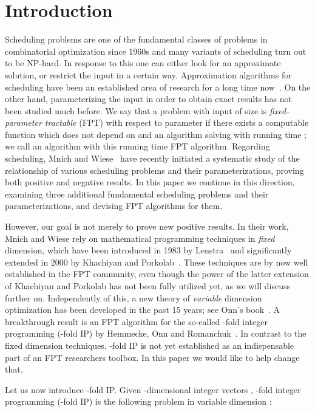 \documentclass{llncs}
\newcommand{\FPT}{{\sf FPT}\xspace}
\newcommand{\NP}{{\sf NP}\xspace}
\begin{document}
\section{Introduction}
Scheduling problems are one of the fundamental classes of problems in combinatorial optimization since 1960s \cite{Allahverdi:15,LawlerLKS:93,Potts:09} and many variants of scheduling turn out to be \NP-hard. In response to this one can either look for an approximate solution, or restrict the input in a certain way. Approximation algorithms for scheduling have been an established area of research for a long time now~\cite{LawlerLKS:93}. On the other hand, parameterizing the input in order to obtain exact results has not been studied much before. We say that a problem  with input of size  is \textit{fixed-parameter tractable} (\FPT) with respect to parameter  if there exists a computable function  which does not depend on  and an algorithm solving  with running time ; we call an algorithm with this running time \FPT algorithm. Regarding scheduling, Mnich and Wiese~\cite{MnichW:14} have recently initiated a systematic study of the relationship of various scheduling problems and their parameterizations, proving both positive and negative results. In this paper we continue in this direction, examining three additional fundamental scheduling problems and their parameterizations, and devising \FPT algorithms for them.

However, our goal is not merely to prove new positive results. In their work, Mnich and Wiese rely on mathematical programming techniques in \textit{fixed} dimension, which have been introduced in 1983 by Lenstra~\cite{Lenstra:83} and significantly extended in 2000 by Khachiyan and Porkolab~\cite{KhachiyanP:00}. These techniques are by now well established in the \FPT community, even though the power of the latter extension of Khachiyan and Porkolab has not been fully utilized yet, as we will discuss further on. Independently of this, a new theory of \textit{variable} dimension optimization has been developed in the past 15 years; see Onn's book~\cite{Onn:10}. A breakthrough result is an \FPT algorithm for the so-called -fold integer programming (-fold IP) by Hemmecke, Onn and Romanchuk~\cite{HemmeckeOR:13}. In contrast to the fixed dimension techniques, -fold IP is not yet established as an indispensable part of an \FPT researchers toolbox. In this paper we would like to help change that.

Let us now introduce -fold IP. Given -dimensional integer vectors , -fold integer programming (-fold IP) is the following problem in variable dimension :
\end{document}
